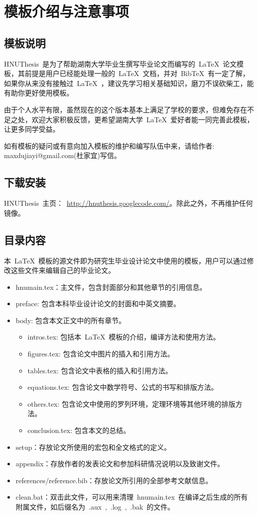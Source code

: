 
\chapter{模板介绍与注意事项}
\section{模板说明}

HNUThesis~是为了帮助湖南大学毕业生撰写毕业论文而编写的~\LaTeX~论文模板，其前提是用户已经能处理一般的~\LaTeX~文档，并对~BibTeX~有一定了解，如果你从来没有接触过~\LaTeX~，建议先学习相关基础知识，磨刀不误砍柴工，能有助你更好使用模板。

由于个人水平有限，虽然现在的这个版本基本上满足了学校的要求，但难免存在不足之处，欢迎大家积极反馈，更希望湖南大学~\LaTeX~爱好者能一同完善此模板，让更多同学受益。

如有模板的疑问或有意向加入模板的维护和编写队伍中来，请给作者: maxdujiayi@gmail.com(杜家宜)写信。

\section{下载安装}
HNUThesis~主页：~\url{http://hnuthesis.googlecode.com/}。除此之外，不再维护任何镜像。

\section{目录内容}
本~\LaTeX{}~模板的源文件即为研究生毕业设计论文中使用的模板，用户可以通过修改这些文件来编辑自己的毕业论文。
\begin{itemize}
\item{hnumain.tex}：主文件，包含封面部分和其他章节的引用信息。
\item{preface}: 包含本科毕业设计论文的封面和中英文摘要。
\item{body}: 包含本文正文中的所有章节。
\begin{itemize}
\item{intros.tex}: 包括本~\LaTeX{}~模板的介绍，编译方法和使用方法。
\item{figures.tex}: 包含论文中图片的插入和引用方法。
\item{tables.tex}: 包含论文中表格的插入和引用方法。
\item{equations.tex}: 包含论文中数学符号、公式的书写和排版方法。
\item{others.tex}: 包含论文中使用的罗列环境，定理环境等其他环境的排版方法。
\item{conclusion.tex}: 包含本文的总结。
\end{itemize}
\item{setup}：存放论文所使用的宏包和全文格式的定义。
\item{appendix}：存放作者的发表论文和参加科研情况说明以及致谢文件。
\item{references/reference.bib}：存放论文所引用的全部参考文献信息。
\item{clean.bat}：双击此文件，可以用来清理~hnumain.tex~在编译之后生成的所有附属文件，如后缀名为~.aux~,~.log~,~.bak~的文件。
\end{itemize}

